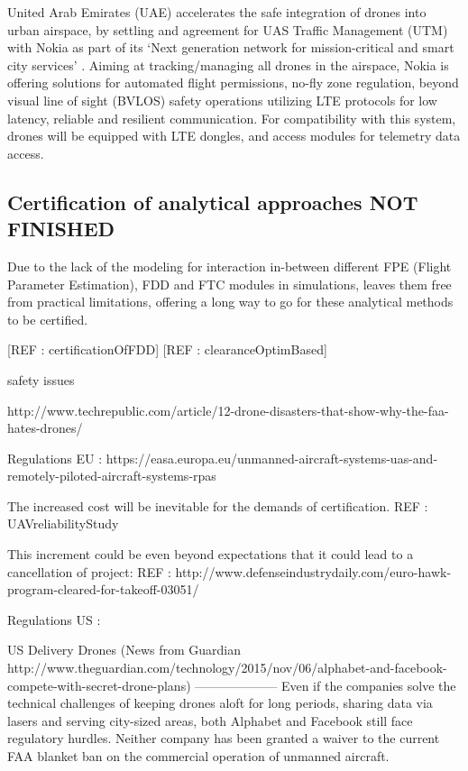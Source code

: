 United Arab Emirates (UAE) accelerates the safe integration of drones into urban airspace, by settling and agreement for UAS Traffic Management (UTM) with Nokia as part of its `Next generation network for mission-critical and smart city services' \cite{nokiaDubai}.
Aiming at tracking/managing all drones in the airspace, Nokia is offering solutions for automated flight permissions, no-fly zone regulation, beyond visual line of sight (BVLOS) safety operations utilizing LTE protocols for low latency, reliable and resilient communication. 
For compatibility with this system, drones will be equipped with LTE dongles, and access modules for telemetry data access.



\iffalse
\subsection{Certification of analytical approaches NOT FINISHED }\label{ch2:certificationOfAnalyticalApproaches}

Due to the lack of the modeling for interaction in-between different FPE  (Flight Parameter Estimation), FDD and FTC modules in simulations, leaves them free from practical limitations, offering a long way to go for these analytical methods to be certified. 

[REF : certificationOfFDD]
[REF : clearanceOptimBased]


safety issues

http://www.techrepublic.com/article/12-drone-disasters-that-show-why-the-faa-hates-drones/


Regulations EU : https://easa.europa.eu/unmanned-aircraft-systems-uas-and-remotely-piloted-aircraft-systems-rpas

The increased cost will be inevitable for the demands of certification. REF : UAVreliabilityStudy

This increment could be even beyond expectations that it could lead to a cancellation of project:  REF : http://www.defenseindustrydaily.com/euro-hawk-program-cleared-for-takeoff-03051/

Regulations US : 

US Delivery Drones (News from Guardian http://www.theguardian.com/technology/2015/nov/06/alphabet-and-facebook-compete-with-secret-drone-plans)
--------------------
Even if the companies solve the technical challenges of keeping drones aloft for long periods, sharing data via lasers and serving city-sized areas, both Alphabet and Facebook still face regulatory hurdles. Neither company has been granted a waiver to the current FAA blanket ban on the commercial operation of unmanned aircraft.

